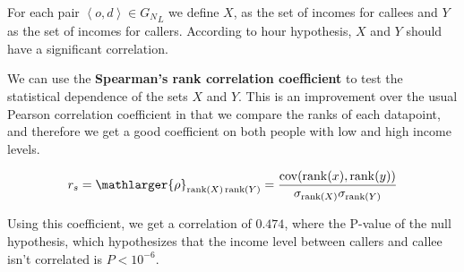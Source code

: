 For each pair \( \left< o, d \right> \in {G_N}_L \) we define \( X \), as the set of incomes for callees and \( Y \) as the set of incomes for callers. According to hour hypothesis, \( X \) and \( Y \) should have a significant correlation.

We can use the \textbf{Spearman's rank correlation coefficient} to test the statistical dependence of the sets \( X \) and \( Y \). This is an improvement over the usual Pearson correlation coefficient in that we compare the ranks of each datapoint, and therefore we get a good coefficient on both people with low and high income levels.

\[
r_s = \mathlarger{\rho}_{\operatorname{rank}(X) \operatorname{rank}(Y)} = \frac{\operatorname{cov}(\operatorname{rank}(x), \operatorname{rank}(y))}{\sigma_{\operatorname{rank}(X)} \sigma_{\operatorname{rank}(Y)}}
\]

Using this coefficient, we get a correlation of \( \num{0.474} \), where the P-value of the null hypothesis, which hypothesizes that the income level between callers and callee isn't correlated is \( P < 10^{-6} \).